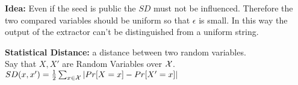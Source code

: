 \textbf{Idea: } Even if the seed is public the $SD$ must not be influenced. Therefore the two compared variables should be uniform so that $\epsilon$ is small. In this way the output of the extractor can't be distinguished from a uniform string.

\begin{definition}
    \textbf{Statistical Distance:} a distance between two random variables.\\
    Say that $X,X'$ are Random Variables over $\mathcal{X}$.\\
    $SD(x,x')=\frac{1}{2}\sum_{x\in \mathcal{X} }|Pr[X=x]-Pr[X'=x]|$
\end{definition}

